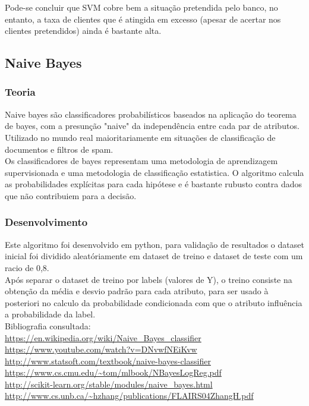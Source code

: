 \documentclass[portugues,final]{revdetua}
\begin{document}
Pode-se concluir que SVM cobre bem a situação pretendida pelo banco, no entanto, a taxa de clientes que é atingida em excesso (apesar de acertar nos clientes pretendidos) ainda é bastante alta.


\subsection{Naive Bayes}

\subsubsection{Teoria}
Naive bayes são classificadores probabilísticos baseados na aplicação do teorema de bayes, com a presunção "naive" da independência entre cada par de atributos. Utilizado no mundo real maioritariamente em situações de classificação de documentos e filtros de spam. \\

Os classificadores de bayes representam uma metodologia de aprendizagem supervisionada e uma metodologia de classificação estatistica. O algoritmo calcula as probabilidades explícitas para cada hipótese e é bastante rubusto contra dados que não contribuiem para a decisão. \\

\subsubsection{Desenvolvimento}

Este algoritmo foi desenvolvido em python, para validação de resultados o dataset inicial foi dividido aleatóriamente em dataset de treino e dataset de teste com um racio de 0,8. \\

Após separar o dataset de treino por labels (valores de Y), o treino consiste na obtenção da média e desvio padrão para cada atributo, para ser usado à posteriori no calculo da probabilidade condicionada com que o atributo influência a probabilidade da label.\\
    
Bibliografia consultada:\\
\url{https://en.wikipedia.org/wiki/Naive_Bayes_classifier}\\
\url{https://www.youtube.com/watch?v=DNvwfNEiKvw}\\
\url{http://www.statsoft.com/textbook/naive-bayes-classifier}\\
\url{https://www.cs.cmu.edu/~tom/mlbook/NBayesLogReg.pdf}\\
\url{http://scikit-learn.org/stable/modules/naive_bayes.html}\\
\url{http://www.cs.unb.ca/~hzhang/publications/FLAIRS04ZhangH.pdf}\\
\end{document}
